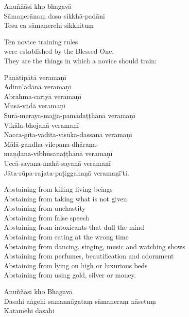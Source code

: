 
Anuññāsi kho bhagavā\\
Sāmaṇerānaṃ dasa sikkhā-padāni\\
Tesu ca sāmaṇerehi sikkhituṃ\\

\begin{english}
  Ten novice training rules\\
  were established by the Blessed One.\\
  They are the things in which a novice should train:
\end{english}

Pāṇātipātā veramaṇī\\
Adinn'ādānā veramaṇī\\
Abrahma-cariyā veramaṇī\\
Musā-vādā veramaṇī\\
Surā-meraya-majja-pamādaṭṭhānā veramaṇī\\
Vikāla-bhojanā veramaṇī\\
Nacca-gīta-vādita-visūka-dassanā veramaṇī\\
Mālā-gandha-vilepana-dhāraṇa-\\
\vin maṇḍana-vibhūsanaṭṭhānā veramaṇī\\
Uccā-sayana-mahā-sayanā veramaṇī\\
Jāta-rūpa-rajata-paṭiggahaṇā veramaṇī'ti.

\begin{english}
  Abstaining from killing living beings\\
  Abstaining from taking what is not given\\
  Abstaining from unchastity\\
  Abstaining from false speech\\
  Abstaining from intoxicants that dull the mind\\
  Abstaining from eating at the wrong time\\
  Abstaining from dancing, singing, music and watching shows\\
  Abstaining from perfumes, beautification and adornment\\
  Abstaining from lying on high or luxurious beds\\
  Abstaining from using gold, silver or money.
\end{english}


Anuññāsi kho Bhagavā\\
Dasahi aṅgehi samannāgataṃ sāmaṇeraṃ nāsetuṃ\\
Katamehi dasahi

